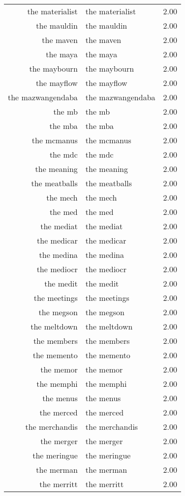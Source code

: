 \begin{table}[ht]
\begin{tabular}{rlr}
  the materialist & the materialist & 2.00 \\ 
  the mauldin & the mauldin & 2.00 \\ 
  the maven & the maven & 2.00 \\ 
  the maya & the maya & 2.00 \\ 
  the maybourn & the maybourn & 2.00 \\ 
  the mayflow & the mayflow & 2.00 \\ 
  the mazwangendaba & the mazwangendaba & 2.00 \\ 
  the mb & the mb & 2.00 \\ 
  the mba & the mba & 2.00 \\ 
  the mcmanus & the mcmanus & 2.00 \\ 
  the mdc & the mdc & 2.00 \\ 
  the meaning & the meaning & 2.00 \\ 
  the meatballs & the meatballs & 2.00 \\ 
  the mech & the mech & 2.00 \\ 
  the med & the med & 2.00 \\ 
  the mediat & the mediat & 2.00 \\ 
  the medicar & the medicar & 2.00 \\ 
  the medina & the medina & 2.00 \\ 
  the mediocr & the mediocr & 2.00 \\ 
  the medit & the medit & 2.00 \\ 
  the meetings & the meetings & 2.00 \\ 
  the megson & the megson & 2.00 \\ 
  the meltdown & the meltdown & 2.00 \\ 
  the members & the members & 2.00 \\ 
  the memento & the memento & 2.00 \\ 
  the memor & the memor & 2.00 \\ 
  the memphi & the memphi & 2.00 \\ 
  the menus & the menus & 2.00 \\ 
  the merced & the merced & 2.00 \\ 
  the merchandis & the merchandis & 2.00 \\ 
  the merger & the merger & 2.00 \\ 
  the meringue & the meringue & 2.00 \\ 
  the merman & the merman & 2.00 \\ 
  the merritt & the merritt & 2.00 \\ 

\end{tabular}
\end{table}
